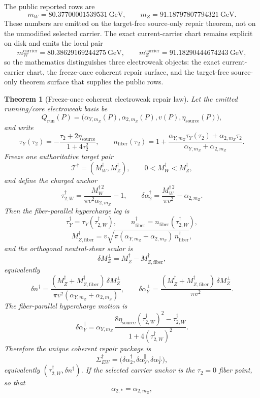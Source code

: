 \documentclass[11pt]{article}
\newtheorem{theorem}{Theorem}[section]
\begin{document}
The public reported rows are
\[
m_W = 80.37700001539531~\mathrm{GeV},
\qquad
m_Z = 91.18797807794321~\mathrm{GeV}.
\]
These numbers are emitted on the target-free source-only repair theorem, not on the unmodified
selected carrier. The exact current-carrier chart remains explicit on disk and emits
the local pair
\[
m_W^{\mathrm{carrier}} = 80.38629169244275~\mathrm{GeV},
\qquad
m_Z^{\mathrm{carrier}} = 91.18290444674243~\mathrm{GeV},
\]
so the mathematics distinguishes three electroweak objects: the exact current-carrier chart, the
freeze-once coherent repair surface, and the target-free source-only theorem surface that supplies
the public rows.

\begin{theorem}[Freeze-once coherent electroweak repair law]
Let the emitted running/core electroweak basis be
\[
Q_{\mathrm{run}}(P)=
\bigl(\alpha_{Y,m_Z}(P),\alpha_{2,m_Z}(P),v(P),\eta_{\mathrm{source}}(P)\bigr),
\]
and write
\[
\tau_Y(\tau_2)
=
-\frac{\tau_2+2\eta_{\mathrm{source}}}{1+4\tau_2^2},
\qquad
n_{\mathrm{fiber}}(\tau_2)
=
1+\frac{\alpha_{Y,m_Z}\tau_Y(\tau_2)+\alpha_{2,m_Z}\tau_2}
{\alpha_{Y,m_Z}+\alpha_{2,m_Z}}.
\]
Freeze one authoritative target pair
\[
\mathcal T^\dagger=(M_W^\dagger,M_Z^\dagger),
\qquad 0<M_W^\dagger<M_Z^\dagger,
\]
and define the charged anchor
\[
\tau_{2,W}^\dagger
=
\frac{M_W^{\dagger\,2}}{\pi v^2\alpha_{2,m_Z}}-1,
\qquad
\delta\alpha_2^\dagger
=
\frac{M_W^{\dagger\,2}}{\pi v^2}-\alpha_{2,m_Z}.
\]
Then the fiber-parallel hypercharge leg is
\[
\tau_Y^\dagger=\tau_Y(\tau_{2,W}^\dagger),
\qquad
n_{\mathrm{fiber}}^\dagger=n_{\mathrm{fiber}}(\tau_{2,W}^\dagger),
\]
\[
M_{Z,\mathrm{fiber}}^\dagger
=
v\sqrt{\pi(\alpha_{Y,m_Z}+\alpha_{2,m_Z})\,n_{\mathrm{fiber}}^\dagger},
\]
and the orthogonal neutral-shear scalar is
\[
\delta M_Z^\perp=M_Z^\dagger-M_{Z,\mathrm{fiber}}^\dagger,
\]
equivalently
\[
\delta n^\dagger
=
\frac{(M_Z^\dagger+M_{Z,\mathrm{fiber}}^\dagger)\,\delta M_Z^\perp}
{\pi v^2(\alpha_{Y,m_Z}+\alpha_{2,m_Z})},
\qquad
\delta\alpha_Y^\perp
=
\frac{(M_Z^\dagger+M_{Z,\mathrm{fiber}}^\dagger)\,\delta M_Z^\perp}{\pi v^2}.
\]
The fiber-parallel hypercharge motion is
\[
\delta\alpha_Y^\parallel
=
\alpha_{Y,m_Z}\,
\frac{8\eta_{\mathrm{source}}(\tau_{2,W}^\dagger)^2-\tau_{2,W}^\dagger}
{1+4(\tau_{2,W}^\dagger)^2}.
\]
Therefore the unique coherent repair package is
\[
\Sigma_{EW}^\dagger
=
\bigl(\delta\alpha_2^\dagger,\delta\alpha_Y^\parallel,\delta\alpha_Y^\perp\bigr),
\]
equivalently \((\tau_{2,W}^\dagger,\delta n^\dagger)\). If the selected carrier anchor is the
\(\tau_2=0\) fiber point, so that
\[
\alpha_{2,*}=\alpha_{2,m_Z},
\]
\end{theorem}
\end{document}
